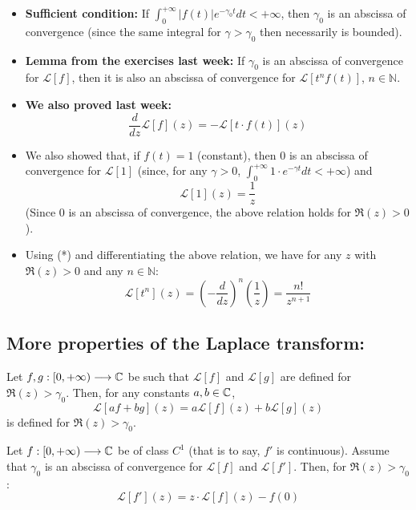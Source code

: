 \begin{itemize}
    \item \textbf{Sufficient condition:} If $\int_{0}^{+\infty} |f(t)| e^{-\gamma_0 t} dt < +\infty$, then $\gamma_0$ is an abscissa of convergence (since the same integral for $\gamma > \gamma_0$ then necessarily is bounded).
    \item \textbf{Lemma from the exercises last week:} If $\gamma_0$ is an abscissa of convergence for $\mathcal{L}[f]$, then it is also an abscissa of convergence for $\mathcal{L}[t^n f(t)]$, $n \in \mathbb{N}$.
    \item \textbf{We also proved last week:}
    \begin{equation}
        \frac{d}{dz}\mathcal{L}[f](z) = -\mathcal{L}[t \cdot f(t)](z) \tag{*}
    \end{equation}
    \item We also showed that, if $f(t) = 1$ (constant), then $0$ is an abscissa of convergence for $\mathcal{L}[1]$ (since, for any $\gamma > 0$, $\int_{0}^{+\infty} 1 \cdot e^{-\gamma t} dt < +\infty$) and
    \[
        \mathcal{L}[1](z) = \frac{1}{z}
    \]
    (Since $0$ is an abscissa of convergence, the above relation holds for $\Re(z) > 0$).
    \item Using (*) and differentiating the above relation, we have for any $z$ with $\Re(z) > 0$ and any $n \in \mathbb{N}$:
    \[
        \mathcal{L}[t^n](z) = \left(-\frac{d}{dz}\right)^n \left(\frac{1}{z}\right) = \frac{n!}{z^{n+1}}
    \]
\end{itemize}

\subsection{More properties of the Laplace transform:}

\begin{theorem}
    Let $f, g: [0, +\infty) \longrightarrow \mathbb{C}$ be such that $\mathcal{L}[f]$ and $\mathcal{L}[g]$ are defined for $\Re(z) > \gamma_0$. Then, for any constants $a, b \in \mathbb{C}$,
    \[
        \mathcal{L}[af + bg](z) = a\mathcal{L}[f](z) + b\mathcal{L}[g](z)
    \]
    is defined for $\Re(z) > \gamma_0$.
\end{theorem}

\begin{theorem}
    Let $f: [0, +\infty) \longrightarrow \mathbb{C}$ be of class $C^1$ (that is to say, $f'$ is continuous). Assume that $\gamma_0$ is an abscissa of convergence for $\mathcal{L}[f]$ and $\mathcal{L}[f']$. Then, for $\Re(z) > \gamma_0$:
    \[
        \mathcal{L}[f'](z) = z \cdot \mathcal{L}[f](z) - f(0)
    \]
\end{theorem}

